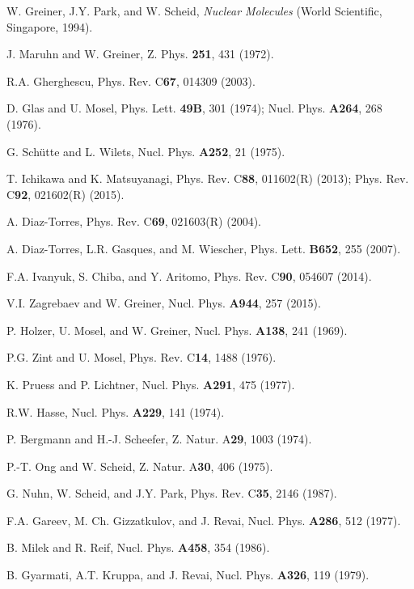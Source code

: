 \documentclass[superscriptaddress,twocolumn,amsmath,amssymb]{revtex4}
\begin{document}
\begin{thebibliography}{99}

W. Greiner, J.Y. Park, and W. Scheid, {\it Nuclear Molecules} 
(World Scientific, Singapore, 1994). 

J. Maruhn and W. Greiner, Z. Phys. {\bf 251}, 431 (1972). 

R.A. Gherghescu, Phys. Rev. C{\bf 67}, 014309 (2003). 

D. Glas and U. Mosel, Phys. Lett. {\bf 49B}, 301 (1974); 
Nucl. Phys. {\bf A264}, 268 (1976). 

G. Sch\"utte and L. Wilets, Nucl. Phys. {\bf A252}, 
21 (1975). 

T. Ichikawa and K. Matsuyanagi, Phys. Rev. C{\bf 88}, 011602(R) (2013); 
Phys. Rev. C{\bf 92}, 021602(R) (2015). 

A. Diaz-Torres, Phys. Rev. C{\bf 69}, 021603(R) (2004). 

A. Diaz-Torres, L.R. Gasques, and M. Wiescher, 
Phys. Lett. {\bf B652}, 255 (2007). 

F.A. Ivanyuk, S. Chiba, and Y. Aritomo, 
Phys. Rev. C{\bf 90}, 054607 (2014). 

V.I. Zagrebaev and W. Greiner, Nucl. Phys. {\bf A944}, 
257 (2015). 

P. Holzer, U. Mosel, and W. Greiner, Nucl. Phys. {\bf A138}, 
241 (1969). 

P.G. Zint and U. Mosel, Phys. Rev. C{\bf 14}, 1488 (1976). 

K. Pruess and P. Lichtner, Nucl. Phys. {\bf A291}, 475 (1977). 

R.W. Hasse, Nucl. Phys. {\bf A229}, 141 (1974). 

P. Bergmann and H.-J. Scheefer, Z. Natur. A{\bf 29}, 1003 (1974). 

P.-T. Ong and W. Scheid, Z. Natur. A{\bf 30}, 406 (1975). 

G. Nuhn, W. Scheid, and J.Y. Park, Phys. Rev. C{\bf 35}, 2146 (1987). 

F.A. Gareev, M. Ch. Gizzatkulov, and J. Revai, 
Nucl. Phys. {\bf A286}, 512 (1977). 

B. Milek and R. Reif, Nucl. Phys. {\bf A458}, 354 (1986). 

B. Gyarmati, A.T. Kruppa, and J. Revai, Nucl. Phys. {\bf A326}, 119 (1979). 


\end{thebibliography}
\end{document}
